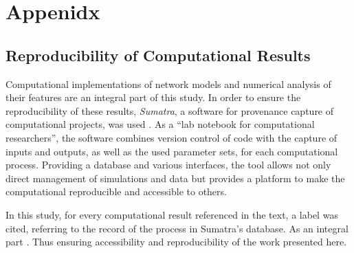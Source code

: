 











\chapter{Appenidx}











\section{Reproducibility of Computational Results}\label{sec:reproducibility}

Computational implementations of network models and numerical analysis
of their features are an integral part of this study. In order to
ensure the reproducibility of these results, \textit{Sumatra}, a
software for provenance capture of computational projects, was
used \parencite{Sumatra2012}. As a \enquote{lab notebook for
computational researchers}, the software combines version control of
code with the capture of inputs and outputs, as well as the used
parameter sets, for each computational process. Providing a database
and various interfaces, the tool allows not only direct management of
simulations and data but provides a platform to make the computational
reproducible and accessible to others.

In this study, for every computational result referenced  in the text, a label was cited, referring
to the record of the process in Sumatra's database. As an integral
part . Thus ensuring accessibility and reproducibility of the work
presented here.


